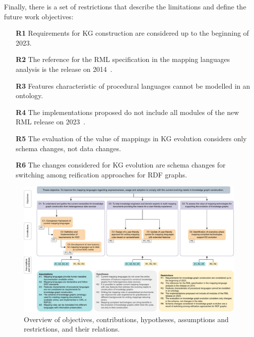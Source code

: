 Finally, there is a set of restrictions that describe the limitations and define the future work objectives:

\begin{enumerate}
    \item[\textbf{R1}] Requirements for KG construction are considered up to the beginning of 2023.
    \item[\textbf{R2}] The reference for the RML specification in the mapping languages analysis is the release on 2014~\parencite{Dimou2014rml}.
    \item[\textbf{R3}] Features characteristic of procedural languages cannot be modelled in an ontology.
    \item[\textbf{R4}] The implementations proposed do not include all modules of the new RML release on 2023~\parencite{iglesias2023rml}. 
    \item[\textbf{R5}] The evaluation of the value of mappings in KG evolution considers only schema changes, not data changes.
    \item[\textbf{R6}] The changes considered for KG evolution are schema changes for switching among reification approaches for RDF graphs.
\end{enumerate}


\begin{figure}
    \centering
    \includegraphics[width=1\linewidth]{figures/chp3_summary.pdf}
    \caption[Relations between objectives, contributions, hypotheses, assumptions and restrictions of this thesis]{Overview of objectives, contributions, hypotheses, assumptions and restrictions, and their relations.}
    \label{fig:chp3_summary}
\end{figure}


